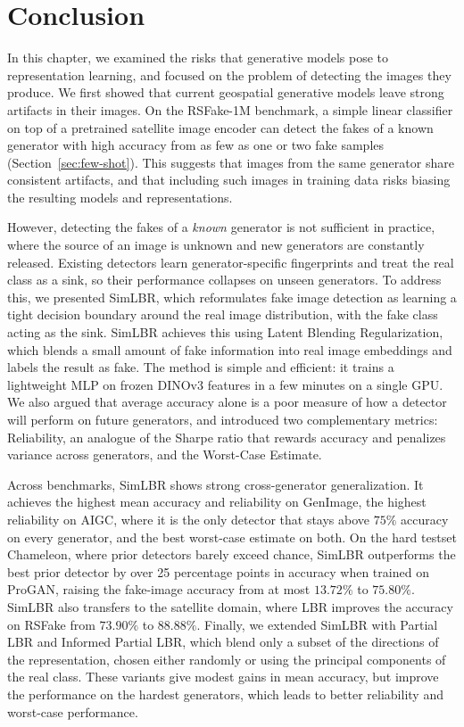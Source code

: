 \section{Conclusion}
\label{sec:ch3_conclusion}
In this chapter, we examined the risks that generative models pose to representation learning, and focused on the problem of detecting the images they produce. We first showed that current geospatial generative models leave strong artifacts in their images. On the RSFake-1M benchmark, a simple linear classifier on top of a pretrained satellite image encoder can detect the fakes of a known generator with high accuracy from as few as one or two fake samples (Section~\ref{sec:few-shot}). This suggests that images from the same generator share consistent artifacts, and that including such images in training data risks biasing the resulting models and representations.

However, detecting the fakes of a \textit{known} generator is not sufficient in practice, where the source of an image is unknown and new generators are constantly released. Existing detectors learn generator-specific fingerprints and treat the real class as a sink, so their performance collapses on unseen generators. To address this, we presented SimLBR, which reformulates fake image detection as learning a tight decision boundary around the real image distribution, with the fake class acting as the sink. SimLBR achieves this using Latent Blending Regularization, which blends a small amount of fake information into real image embeddings and labels the result as fake. The method is simple and efficient: it trains a lightweight MLP on frozen DINOv3 features in a few minutes on a single GPU. We also argued that average accuracy alone is a poor measure of how a detector will perform on future generators, and introduced two complementary metrics: Reliability, an analogue of the Sharpe ratio that rewards accuracy and penalizes variance across generators, and the Worst-Case Estimate.

Across benchmarks, SimLBR shows strong cross-generator generalization. It achieves the highest mean accuracy and reliability on GenImage, the highest reliability on AIGC, where it is the only detector that stays above $75\%$ accuracy on every generator, and the best worst-case estimate on both. On the hard testset Chameleon, where prior detectors barely exceed chance, SimLBR outperforms the best prior detector by over 25 percentage points in accuracy when trained on ProGAN, raising the fake-image accuracy from at most $13.72\%$ to $75.80\%$. SimLBR also transfers to the satellite domain, where LBR improves the accuracy on RSFake from $73.90\%$ to $88.88\%$. Finally, we extended SimLBR with Partial LBR and Informed Partial LBR, which blend only a subset of the directions of the representation, chosen either randomly or using the principal components of the real class. These variants give modest gains in mean accuracy, but improve the performance on the hardest generators, which leads to better reliability and worst-case performance.

